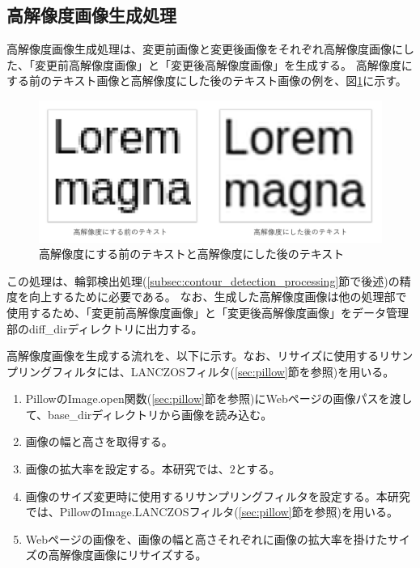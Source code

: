 \subsection{高解像度画像生成処理}\label{subsec:Generate_high_images}
高解像度画像生成処理は、変更前画像と変更後画像をそれぞれ高解像度画像にした、「変更前高解像度画像」と「変更後高解像度画像」を生成する。
高解像度にする前のテキスト画像と高解像度にした後のテキスト画像の例を、図\ref{fig: high_compare}に示す。
\begin{figure}[tp]
    \begin{center}
        \includegraphics[width=1.0\columnwidth]{image/4_high_compare.png}
        \caption{高解像度にする前のテキストと高解像度にした後のテキスト}
        \label{fig: high_compare}
    \end{center}
\end{figure}
この処理は、輪郭検出処理(\ref{subsec:contour_detection_processing}節で後述)の精度を向上するために必要である。
なお、生成した高解像度画像は他の処理部で使用するため、「変更前高解像度画像」と「変更後高解像度画像」をデータ管理部のdiff\_dirディレクトリに出力する。
\par
高解像度画像を生成する流れを、以下に示す。なお、リサイズに使用するリサンプリングフィルタには、LANCZOSフィルタ(\ref{sec:pillow}節を参照)を用いる。
\begin{enumerate}
    \item PillowのImage.open関数(\ref{sec:pillow}節を参照)にWebページの画像パスを渡して、base\_dirディレクトリから画像を読み込む。
    \item 画像の幅と高さを取得する。
    \item 画像の拡大率を設定する。本研究では、$2$とする。
    \item 画像のサイズ変更時に使用するリサンプリングフィルタを設定する。本研究では、PillowのImage.LANCZOSフィルタ(\ref{sec:pillow}節を参照)を用いる。
    \item Webページの画像を、画像の幅と高さそれぞれに画像の拡大率を掛けたサイズの高解像度画像にリサイズする。
\end{enumerate}


